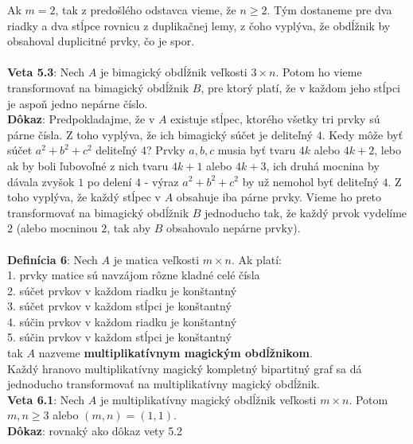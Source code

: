 \documentclass[12pt]{article}
\begin{document}
Ak $m = 2$, tak z predošlého odstavca vieme, že $n \geq 2$. Tým dostaneme pre dva riadky a dva stĺpce rovnicu z duplikačnej lemy, z čoho vyplýva, že obdĺžnik by obsahoval duplicitné prvky, čo je spor. \\\\

\textbf{Veta 5.3}: Nech $A$ je bimagický obdĺžnik veľkosti $3 \times n$. Potom ho vieme transformovať na bimagický obdĺžnik $B$, pre ktorý platí, že v každom jeho stĺpci je aspoň jedno nepárne číslo. \\

\textbf{Dôkaz}: Predpokladajme, že v $A$ existuje stĺpec, ktorého všetky tri prvky sú párne čísla. Z toho vyplýva, že ich bimagický súčet je deliteľný $4$. Kedy môže byť súčet $a^2 + b^2 + c^2$ deliteľný $4$? Prvky $a,b,c$ musia byť tvaru $4k$ alebo $4k+2$, lebo ak by boli ľubovoľné z nich tvaru $4k+1$ alebo $4k+3$, ich druhá mocnina by dávala zvyšok $1$ po delení $4$ - výraz $a^2 + b^2 + c^2$ by už nemohol byť deliteľný $4$. Z toho vyplýva, že každý stĺpec v $A$ obsahuje iba párne prvky. Vieme ho preto transformovať na bimagický obdĺžnik $B$ jednoducho tak, že každý prvok vydelíme $2$ (alebo mocninou $2$, tak aby $B$ obsahovalo nepárne prvky). \\\\
 
\textbf{Definícia 6}: Nech $A$ je matica veľkosti $m \times n$. Ak platí: \\
1. prvky matice sú navzájom rôzne kladné celé čísla \\
2. súčet prvkov v každom riadku je konštantný \\
3. súčet prvkov v každom stĺpci je konštantný \\
4. súčin prvkov v každom riadku je konštantný \\
5. súčin prvkov v každom stĺpci je konštantný \\
tak $A$ nazveme \textbf{multiplikatívnym magickým obdĺžnikom}. \\

Každý hranovo multiplikatívny magický kompletný bipartitný graf sa dá jednoducho transformovať na multiplikatívny magický obdĺžnik. \\

\textbf{Veta 6.1}: Nech $A$ je multiplikatívny magický obdĺžnik veľkosti $m \times n$. Potom $m,n \geq 3$ alebo $(m, n) = (1, 1)$. \\

\textbf{Dôkaz}: rovnaký ako dôkaz vety 5.2
\end{document}
